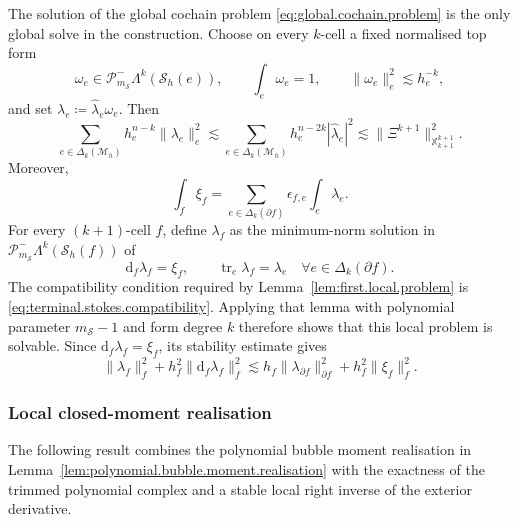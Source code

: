 \documentclass[a4paper,11pt]{article}
\theoremstyle{definition}
\newcommand{\DIFF}{\mathrm{d}}
\newcommand{\Mh}{\mathcal{M}_h}
\newcommand{\Sh}{\mathcal{S}_h}
\newcommand{\FM}[1]{\Delta_{#1}}
\newcommand{\PLtrim}[2]{\mathcal{P}_{#1}^{-}\Lambda^{#2}}
\newcommand{\trc}{\operatorname{tr}}
\begin{document}
The solution of the global cochain problem \eqref{eq:global.cochain.problem} is the only global solve in the construction.
Choose on every $k$-cell a fixed normalised top form
\[
  \omega_e\in\PLtrim{m_{\mathcal S}}{k}(\Sh(e)),
  \qquad
  \int_e\omega_e=1,
  \qquad
  \|\omega_e\|_e^2\lesssim h_e^{-k},
\]
and set $\lambda_e\coloneqq\widehat\lambda_e\omega_e$.
Then
\begin{equation}\label{eq:terminal.form.stability}
  \sum_{e\in\FM{k}(\Mh)}
  h_e^{n-k}\|\lambda_e\|_e^2
  \lesssim
  \sum_{e\in\FM{k}(\Mh)}
  h_e^{n-2k}|\widehat\lambda_e|^2
  \lesssim
  \|\Xi^{k+1}\|_{\mathbb X_{k+1}^{k+1}}^2.
\end{equation}
Moreover,
\begin{equation}\label{eq:terminal.stokes.compatibility}
  \int_f\xi_f
  =
  \sum_{e\in\FM{k}(\partial f)}
  \epsilon_{f,e}\int_e\lambda_e.
\end{equation}
For every $(k+1)$-cell $f$, define $\lambda_f$ as the minimum-norm solution in $\PLtrim{m_{\mathcal S}}{k}(\Sh(f))$ of
\[
  \DIFF_f\lambda_f=\xi_f,
  \qquad
  \trc_e\lambda_f=\lambda_e
  \quad
  \forall e\in\FM{k}(\partial f).
\]
The compatibility condition required by Lemma~\ref{lem:first.local.problem} is \eqref{eq:terminal.stokes.compatibility}.
Applying that lemma with polynomial parameter $m_{\mathcal S}-1$ and form degree $k$ therefore shows that this local problem is solvable.
Since $\DIFF_f\lambda_f=\xi_f$, its stability estimate gives
\begin{equation}\label{eq:first.upward.stability}
  \|\lambda_f\|_f^2
  +
  h_f^2\|\DIFF_f\lambda_f\|_f^2
  \lesssim
  h_f\|\lambda_{\partial f}\|_{\partial f}^2
  +
  h_f^2\|\xi_f\|_f^2.
\end{equation}

\subsubsection{Local closed-moment realisation}
\label{subsubsec:closed.moment.realisation}

The following result combines the polynomial bubble moment realisation in Lemma~\ref{lem:polynomial.bubble.moment.realisation} with the exactness of the trimmed polynomial complex and a stable local right inverse of the exterior derivative.
\end{document}
